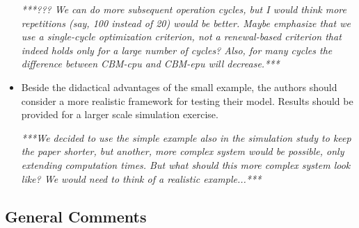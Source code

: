 \documentclass[authoryear]{elsarticle}
\begin{document}
\begin{itemize}
\emph{***??? We can do more subsequent operation cycles,
but I would think more repetitions (say, 100 instead of 20) would be better.
Maybe emphasize that we use a single-cycle optimization criterion,
not a renewal-based criterion that indeed holds only for a large number of cycles?
Also, for many cycles the difference between CBM-cpu and CBM-epu will decrease.***}

\item Beside the didactical advantages of the small example, the authors should consider a more realistic framework for testing their model. Results should be provided for a larger scale simulation exercise.

\smallskip

\emph{***We decided to use the simple example also in the simulation study to keep the paper shorter,
but another, more complex system would be possible, only extending computation times.
But what should this more complex system look like? We would need to think of a realistic example...***}
\end{itemize}


\subsection*{General Comments}
\end{document}

